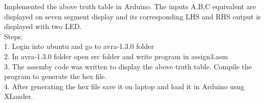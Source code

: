 \documentclass[10pt,a4paper]{article}
\begin{document}
Implemented the above truth table in Arduino. The inputs A,B,C equivalent are displayed on seven segment display and its corresponding LHS and RHS output is displayed with two LED.\\
Steps: \\
1. Login into ubuntu and go to avra-1.3.0 folder\\
2. In avra-1.3.0 folder open src folder and write program in assign3.asm\\
3. The assemby code was written to display the above truth table. Compile the program to generate the hex file.\\
4. After generating the hex file save it on laptop and load it in Arduino usng XLoader.\\
\end{document}

